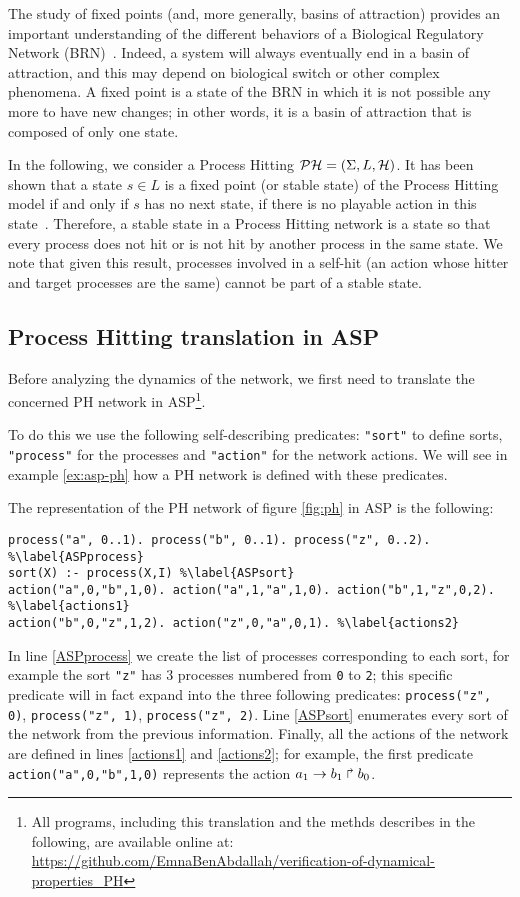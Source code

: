 The study of fixed points (and, more generally, basins of attraction) provides an important understanding of the different behaviors of a Biological Regulatory Network (BRN)~\cite{wuensche1998genomic}.
Indeed, a system will always eventually end in a basin of attraction,
and this may depend on biological switch or other complex phenomena.
A fixed point is a state of the BRN in which it is not possible any more to have new changes;
in other words, it is a basin of attraction that is composed of only one state.

In the following, we consider a Process Hitting $\mathcal{PH} = (\Sigma, L, \mathcal{H})$.
It has been shown that a state $s \in L$ is a fixed point (or stable state) of the Process Hitting model if and only if $s$ has no next state, \ie if there is no playable action in this state~\cite{PMR10-TCSB}.
Therefore, a stable state in a Process Hitting network is a state so that
every process does not hit or is not hit by another process in the same state.
We note that given this result, processes involved in a self-hit (an action whose hitter and target processes are the same) cannot be part of a stable state.

\subsection{Process Hitting translation in ASP}
Before analyzing the dynamics of the network,
we first need to translate the concerned PH network in ASP\footnote{All programs, including this translation and the methds describes in the following, are available online at: \url{https://github.com/EmnaBenAbdallah/verification-of-dynamical-properties_PH}}.

To do this we use the following self-describing predicates:
\texttt{"sort"} to define sorts, \texttt{"process"} for the processes and \texttt{"action"} for the network actions. We will see in example \ref{ex:asp-ph} how a PH network is defined with these predicates.

\begin{example}
\label{ex:asp-ph}
The representation of the PH network of figure \ref{fig:ph} in ASP is the following:
\begin{lstlisting}
process("a", 0..1). process("b", 0..1). process("z", 0..2). %\label{ASPprocess}
sort(X) :- process(X,I) %\label{ASPsort}
action("a",0,"b",1,0). action("a",1,"a",1,0). action("b",1,"z",0,2). %\label{actions1}
action("b",0,"z",1,2). action("z",0,"a",0,1). %\label{actions2}
\end{lstlisting}
In line \ref{ASPprocess} we create the list of processes corresponding to each sort,
for example the sort \texttt{"z"} has 3 processes numbered from \texttt{0} to \texttt{2};
this specific predicate will in fact expand into the three following predicates:
\texttt{process("z", 0)}, \texttt{process("z", 1)}, \texttt{process("z", 2)}.
Line \ref{ASPsort} enumerates every sort of the network from the previous information.
Finally, all the actions of the network are defined in lines \ref{actions1} and \ref{actions2};
for example, the first predicate \texttt{action("a",0,"b",1,0)} represents the action
$a_1\rightarrow b_1\Rsh b_0$.
\end{example}

